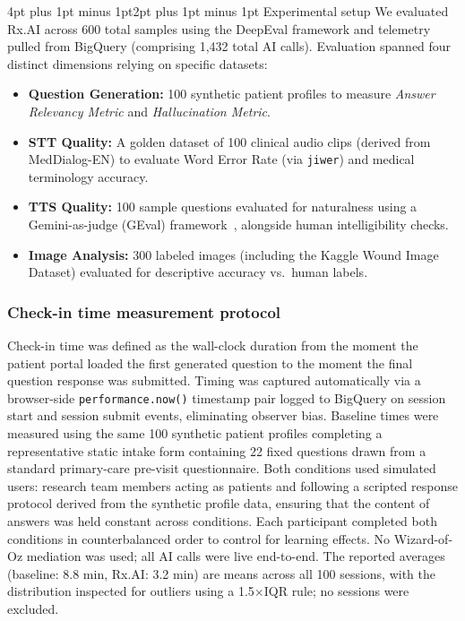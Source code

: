 \documentclass[sigplan,screen]{acmart}
\makeatletter
\renewcommand{\subsection}{\@startsection{subsection}{2}{\z@}
  {4pt plus 1pt minus 1pt}{2pt plus 1pt minus 1pt}
  {\normalfont\normalsize\bfseries}}
\makeatother
\begin{document}
\subsection{Experimental setup}
We evaluated Rx.AI across 600 total samples using the DeepEval framework and
telemetry pulled from BigQuery (comprising 1,432 total AI calls). Evaluation
spanned four distinct dimensions relying on specific datasets:
\begin{itemize}
\item \textbf{Question Generation:} 100 synthetic patient profiles to measure \textit{Answer Relevancy Metric} and \textit{Hallucination Metric}.
\item \textbf{STT Quality:} A golden dataset of 100 clinical audio clips
  (derived from MedDialog-EN) to evaluate Word Error Rate (via \texttt{jiwer})
  and medical terminology accuracy.
\item \textbf{TTS Quality:} 100 sample questions evaluated for naturalness
using a Gemini-as-judge (GEval) framework~\cite{geval}, alongside human intelligibility
checks.
\item \textbf{Image Analysis:} 300 labeled images (including the Kaggle Wound
  Image Dataset) evaluated for descriptive accuracy vs.\ human labels.
\end{itemize}

\subsubsection{Check-in time measurement protocol}
Check-in time was defined as the wall-clock duration from the moment the patient
portal loaded the first generated question to the moment the final question
response was submitted. Timing was captured automatically via a browser-side
\texttt{performance.now()} timestamp pair logged to BigQuery on session start and
session submit events, eliminating observer bias. Baseline times were measured
using the same 100 synthetic patient profiles completing a representative static
intake form containing 22 fixed questions drawn from a standard primary-care
pre-visit questionnaire. Both conditions used simulated users: research team
members acting as patients and following a scripted response protocol derived
from the synthetic profile data, ensuring that the content of answers was held
constant across conditions. Each participant completed both conditions in
counterbalanced order to control for learning effects. No Wizard-of-Oz
mediation was used; all AI calls were live end-to-end. The reported averages
(baseline: 8.8 min, Rx.AI: 3.2 min) are means across all 100 sessions, with
the distribution inspected for outliers using a 1.5$\times$IQR rule; no sessions
were excluded.
\end{document}
